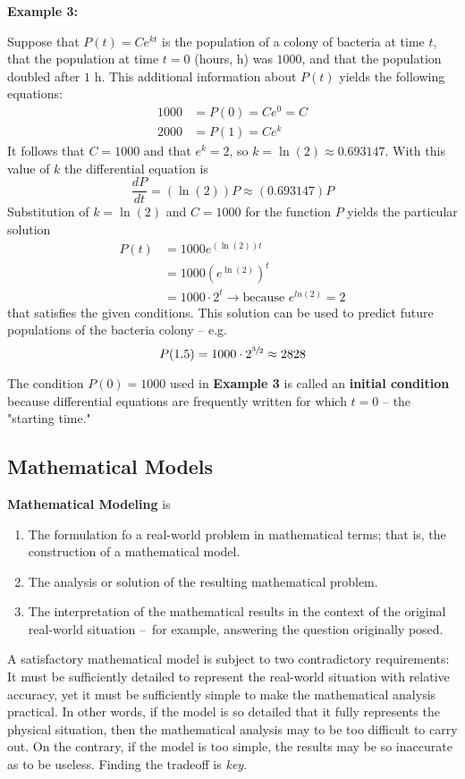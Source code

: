 \documentclass{article}
\begin{document}
\textbf{Example 3:}

Suppose that $ P(t) = Ce^{kt} $ is the population of a colony of bacteria at time $ t $, that the population at time $ t = 0 $ (hours, h) was $ 1000 $, and that the population doubled after $ 1 $ h. This additional information about $ P(t) $ yields the following equations:
\begin{align*}
    1000 & = P(0) = Ce^0 = C \\
    2000 & = P(1) = Ce^k
\end{align*}
It follows that $ C = 1000 $ and that $ e^k = 2 $, so $ k = \ln(2) \approx 0.693147 $. With this value of $ k $ the differential equation is
$$ \frac{dP}{dt} = (\ln(2))P \approx (0.693147)P $$
Substitution of $ k = \ln(2) $ and $ C = 1000 $ for the function $ P $ yields the particular solution
\begin{align*}
    P(t) & = 1000e^{\left(\ln(2)\right)t} \\
         & = 1000\left(e^{\ln(2)}\right)^t \\
         & = 1000 \cdot 2^t \rightarrow \text{because } e^{ln(2)} = 2
\end{align*}
that satisfies the given conditions. This solution can be used to predict future populations of the bacteria colony – e.g.
$$ P(1.5) = 1000 \cdot 2^{\sfrac{3}{2}} \approx 2828 $$

The condition $ P(0) = 1000 $ used in \textbf{Example 3} is called an \textbf{initial condition} because differential equations are frequently written for which $ t = 0 $ – the "starting time."

\subsection{Mathematical Models}

\textbf{Mathematical Modeling} is
\begin{enumerate}
    \item The formulation fo a real-world problem in mathematical terms; that is, the construction of a mathematical model.
    \item The analysis or solution of the resulting mathematical problem.
    \item The interpretation of the mathematical results in the context of the original real-world situation – for example, answering the question originally posed.
\end{enumerate}

A satisfactory mathematical model is subject to two contradictory requirements: It must be sufficiently detailed to represent the real-world situation with relative accuracy, yet it must be sufficiently simple to make the mathematical analysis practical. In other words, if the model is so detailed that it fully represents the physical situation, then the mathematical analysis may to be too difficult to carry out. On the contrary, if the model is too simple, the results may be so inaccurate as to be useless. Finding the tradeoff is \textit{key}.
\end{document}
